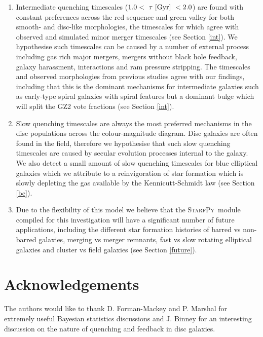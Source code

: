\documentclass[useAMS,usenatbib]{mn2e}
\def\changed    {\color{titlecol} }
\def\starfpy {\textsc{StarfPy}}
\begin{document}
\begin{enumerate}
\item Intermediate quenching timescales ($1.0 < ~\tau~\rm{[Gyr]}~ < 2.0 $) are found with constant preferences across the red sequence and green valley for both smooth- and disc-like morphologies, the timescales for which agree with observed and simulated minor merger timescales (see Section \ref{int}). We hypothesise such timescales can be caused by a number of external process including gas rich major mergers, mergers without black hole feedback, galaxy harassment, interactions and ram pressure stripping. The timescales and observed morphologies from previous studies agree with our findings, including that this is the dominant mechanisms for intermediate galaxies such as early-type spiral galaxies with spiral features but a dominant bulge which will split the GZ2 vote fractions (see Section \ref{int}). 

\item Slow quenching timescales are always the most preferred mechanisms in the disc populations across the colour-magnitude diagram. Disc galaxies are often found in the field, therefore we hypothesise that such slow quenching timescales are caused by secular evolution processes internal to the galaxy. {\changed We also detect a small amount of slow quenching timescales for blue elliptical galaxies which we attribute to a reinvigoration of star formation which is slowly depleting the gas available by the Kennicutt-Schmidt law (see Section \ref{bc}).}

\item Due to the flexibility of this model we believe that the \starfpy ~module compiled for this investigation will have a significant number of future applications, including the different star formation histories of barred vs non-barred galaxies, merging vs merger remnants, fast vs slow rotating elliptical galaxies and cluster vs field galaxies (see Section \ref{future}).
\end{enumerate}


\section*{Acknowledgements}
The authors would like to thank D. Forman-Mackey and P. Marshal for extremely useful Bayesian statistics discussions and J. Binney for an interesting discussion on the nature of quenching and feedback in disc galaxies. 
\end{document}
